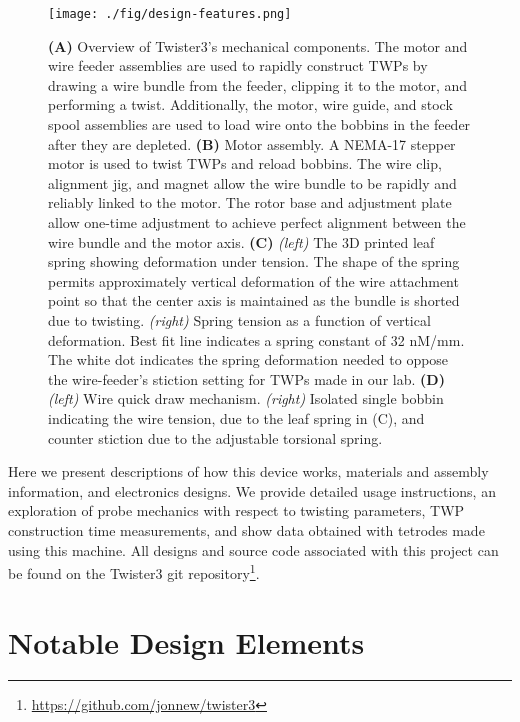 \documentclass[11pt,a4paper]{article}
\begin{document}
\begin{figure}
\centering \texttt{[image: ./fig/design-features.png]}
\caption{\textbf{(A)} Overview of Twister3's mechanical components. The
    motor and wire feeder assemblies are used to rapidly construct TWPs by
    drawing a wire bundle from the feeder, clipping it to the motor, and
    performing a twist. Additionally, the motor, wire guide, and stock spool
    assemblies are used to load wire onto the bobbins in the feeder after they
    are depleted.
    \textbf{(B)} Motor assembly. A NEMA-17 stepper motor is used to twist TWPs
    and reload bobbins. The wire clip, alignment jig, and magnet allow the wire
    bundle to be rapidly and reliably linked to the motor. The rotor base and
    adjustment plate allow one-time adjustment to achieve perfect alignment
    between the wire bundle and the motor axis.
    \textbf{(C)} \textit{(left)} The 3D printed leaf spring showing deformation
    under tension. The shape of the spring permits approximately vertical
    deformation of the wire attachment point so that the center axis is
    maintained as the bundle is shorted due to twisting. \textit{(right)}
    Spring tension as a function of vertical deformation. Best fit line
    indicates a spring constant of 32 nM/mm. The white dot indicates the spring deformation
    needed to oppose the wire-feeder's stiction setting for TWPs made in our lab.
    \textbf{(D)} \textit{(left)} Wire quick draw mechanism. \textit{(right)} Isolated
    single bobbin indicating the wire tension, due to the leaf spring in (C),
    and counter stiction due to the adjustable torsional spring.}
\label{f:design-features}
\end{figure}


Here we present descriptions of how this device works, materials and assembly
information, and electronics designs. We provide detailed usage
instructions, an exploration of probe mechanics with respect to twisting
parameters, TWP construction time measurements, and show data obtained with
tetrodes made using this machine. All designs and source code associated with
this project can be found on the Twister3 git
repository\footnote{\url{https://github.com/jonnew/twister3}}.

\section{Notable Design Elements}
\end{document}
